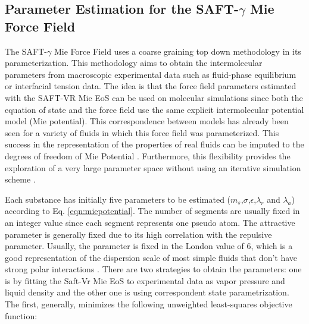 \subsection{Parameter Estimation for the SAFT-$\gamma$ Mie Force Field}\label{parsaft}

The SAFT-$\gamma$ Mie Force Field uses a coarse graining top down methodology in its parameterization. This methodology aims to obtain the intermolecular parameters from macroscopic experimental data such as fluid-phase equilibrium or interfacial tension data. The idea is that the force field  parameters estimated with the SAFT-VR Mie EoS can be used on molecular simulations since both the equation of state and the force field use the same explicit intermolecular potential model (Mie potential). This correspondence between models has already been seen for a variety of fluids in which this force field was parameterized. This success in the representation of the properties of real fluids can be imputed to the degrees of freedom of Mie Potential \cite{herdes2015}. Furthermore, this flexibility provides the exploration of a very large parameter space without using an iterative simulation scheme \cite{avendano2011}. 

Each substance has initially five parameters to be estimated ($m_s$,$\sigma$,$\epsilon$,$\lambda_{r}$ and $\lambda_{a}$) according to Eq. \eqref{eqn:miepotential}. The number of segments are usually fixed in an integer value since each segment represents one pseudo atom. The attractive parameter is generally  fixed due to its  high correlation with the repulsive parameter. Usually, the parameter is fixed in the London value of 6, which is a good representation of the dispersion scale of most simple fluids that don't have strong polar interactions \cite{ramrattan2015,herdes2015}. There are two strategies to obtain the parameters: one is by fitting the Saft-Vr Mie EoS to experimental data as vapor pressure and liquid density and the other one is using correspondent state parametrization. The first, generally, minimizes the following unweighted least-squares objective function:

